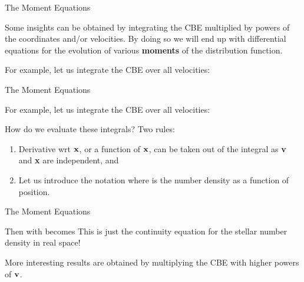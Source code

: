 \documentclass[letterpaper,landscape]{slides}
\begin{document}
\begin{slide}
\begin{center}
{\large \color{red} 
                    The Moment Equations     }
\end{center}

Some insights can be obtained by integrating the CBE multiplied by powers 
of the coordinates and/or velocities. By doing so we will end up
with differential equations for the evolution of various {\bf moments} of
the distribution function.

For example, let us integrate the CBE over all velocities:


\vfill
\end{slide}


\begin{slide}
\begin{center}
{\large \color{red} 
                    The Moment Equations     }
\end{center}

For example, let us integrate the CBE over all velocities:

How do we evaluate these integrals? Two rules: 
\begin{enumerate}
\item Derivative wrt ${\bf x}$, or a function of ${\bf x}$, can be taken out of the
integral as {\bf v} and {\bf x} are independent, and
\item Let us introduce the notation 
where
is the number density as a function of position.
\end{enumerate}

\vfill
\end{slide}


\begin{slide}
\begin{center}
{\large \color{red} 
                    The Moment Equations     }
\end{center}

Then
with
becomes
This is just the continuity equation for the stellar number density in real
space!

More interesting results are obtained by multiplying the CBE with higher powers
of ${\bf v}$. 
\vfill
\end{slide}
\end{document}
